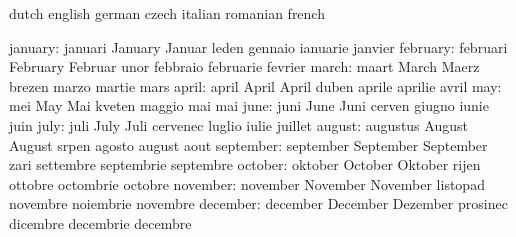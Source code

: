 \startvariables            dutch                     english
                           german                    czech
                           italian                   romanian
                           french

                  january: januari                   January
                           Januar                    leden
                           gennaio                   ianuarie
                           janvier
                 february: februari                  February
                           Februar                   unor
                           febbraio                  februarie
                           fevrier
                    march: maart                     March
                           Maerz                     brezen
                           marzo                     martie
                           mars
                    april: april                     April
                           April                     duben
                           aprile                    aprilie
                           avril
                      may: mei                       May
                           Mai                       kveten
                           maggio                    mai
                           mai
                     june: juni                      June
                           Juni                      cerven
                           giugno                    iunie
                           juin
                     july: juli                      July
                           Juli                      cervenec
                           luglio                    iulie
                           juillet
                   august: augustus                  August
                           August                    srpen
                           agosto                    august
                           aout
                september: september                 September
                           September                 zari
                           settembre                 septembrie
                           septembre
                  october: oktober                   October
                           Oktober                   rijen
                           ottobre                   octombrie
                           octobre
                 november: november                  November
                           November                  listopad
                           novembre                  noiembrie
                           novembre
                 december: december                  December
                           Dezember                  prosinec
                           dicembre                  decembrie
                           decembre
\stopvariables

